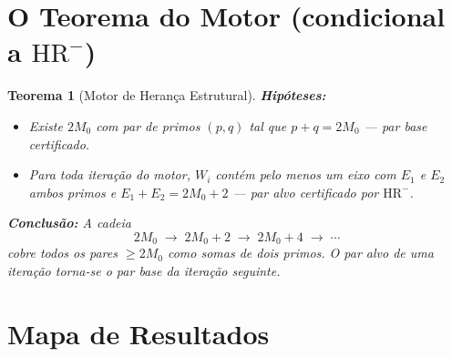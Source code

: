 \documentclass[12pt,a4paper]{article}
\newtheorem{theorem}{Teorema}[section]
\theoremstyle{definition}
\newcommand{\HRm}{\mathrm{HR}^{-}}
\begin{document}
\section{O Teorema do Motor (condicional a \texorpdfstring{$\HRm$}{HR-})}
\label{sec:teorema}

\begin{theorem}[Motor de Herança Estrutural]
	\textbf{Hipóteses:}
	\begin{itemize}[itemsep=2pt]
		\item[\textup{(HI)}] Existe $2M_0$ com par de primos $(p,q)$ tal que
		$p + q = 2M_0$ — par base certificado.
		\item[\textup{($\HRm$)}] Para toda iteração do motor, $W_i$ contém
		pelo menos um eixo com $E_1$ e $E_2$ ambos primos e
		$E_1 + E_2 = 2M_0{+}2$ — par alvo certificado por $\HRm$.
	\end{itemize}

	\textbf{Conclusão:} A cadeia
	\[
		2M_0 \;\to\; 2M_0{+}2 \;\to\; 2M_0{+}4 \;\to\; \cdots
	\]
	cobre todos os pares $\geq 2M_0$ como somas de dois primos. O par alvo
	de uma iteração torna-se o par base da iteração seguinte.
\end{theorem}

\section{Mapa de Resultados}
\label{sec:mapa}
\end{document}
